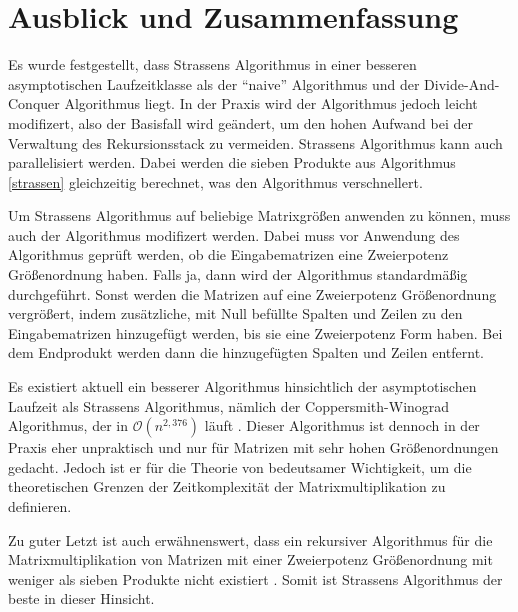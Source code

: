 \section{Ausblick und Zusammenfassung}
\label{sec:conclusion}

Es wurde festgestellt, dass Strassens Algorithmus in einer besseren asymptotischen Laufzeitklasse als der \enquote{naive} Algorithmus und der Divide-And-Conquer Algorithmus liegt. In der Praxis wird der Algorithmus jedoch leicht modifizert, also der Basisfall wird geändert, um den hohen Aufwand bei der Verwaltung des Rekursionsstack zu vermeiden. Strassens Algorithmus kann auch parallelisiert werden. Dabei werden die sieben Produkte aus Algorithmus \ref{strassen} gleichzeitig berechnet, was den Algorithmus verschnellert.

Um Strassens Algorithmus auf beliebige Matrixgrößen anwenden zu können, muss auch der Algorithmus modifizert werden. Dabei muss vor Anwendung des Algorithmus geprüft werden, ob die Eingabematrizen eine Zweierpotenz Größenordnung haben. Falls ja, dann wird der Algorithmus standardmäßig durchgeführt. Sonst werden die Matrizen auf eine Zweierpotenz Größenordnung vergrößert, indem zusätzliche, mit Null befüllte Spalten und Zeilen zu den Eingabematrizen hinzugefügt werden, bis sie eine Zweierpotenz Form haben. Bei dem Endprodukt werden dann die hinzugefügten Spalten und Zeilen entfernt.

Es existiert aktuell ein besserer Algorithmus hinsichtlich der asymptotischen Laufzeit als Strassens Algorithmus, nämlich der Coppersmith-Winograd Algorithmus, der in $\mathcal{O}(n^{2,376})$ läuft \cite{books/daglib/0023376}. Dieser Algorithmus ist dennoch in der Praxis eher unpraktisch und nur für Matrizen mit sehr hohen Größenordnungen gedacht. Jedoch ist er für die Theorie von bedeutsamer Wichtigkeit, um die theoretischen Grenzen der Zeitkomplexität der Matrixmultiplikation zu definieren.

Zu guter Letzt ist auch erwähnenswert, dass ein rekursiver Algorithmus für die Matrixmultiplikation von Matrizen mit einer Zweierpotenz Größenordnung mit weniger als sieben Produkte nicht existiert \cite{https://doi.org/10.48550/arxiv.math/0407224}. Somit ist Strassens Algorithmus der beste in dieser Hinsicht.